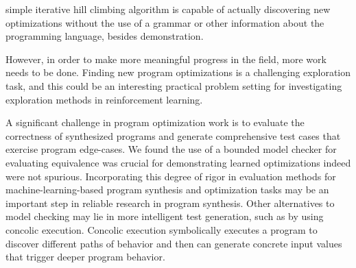 \documentclass{article}
\begin{document}
simple iterative hill climbing algorithm is capable of actually discovering new optimizations without the use of a grammar or other information about the programming language, besides demonstration. 

However, in order to make more meaningful progress in the field, more work needs to be done. Finding new program optimizations is a challenging exploration task, and this could be an interesting practical problem setting for investigating exploration methods in reinforcement learning. 

A significant challenge in program optimization work is to evaluate the correctness of synthesized programs and generate comprehensive test cases that exercise program edge-cases. We found the use of a bounded model checker for evaluating equivalence was crucial for demonstrating learned optimizations indeed were not spurious. Incorporating this degree of rigor in evaluation methods for machine-learning-based program synthesis and optimization tasks may be an important step in reliable research in program synthesis. Other alternatives to model checking may lie in more intelligent test generation, such as by using concolic execution.  Concolic execution symbolically executes a program to discover different paths of behavior and then can generate concrete input values that trigger deeper program behavior. 






\end{document}
